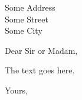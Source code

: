 \documentclass{letter}
\begin{document}
	
	\begin{letter}{Some Address\\Some Street\\Some City}
		\opening{Dear Sir or Madam,}
		
		The text goes here.
		
		\closing{Yours,}
	\end{letter}
	
\end{document}
